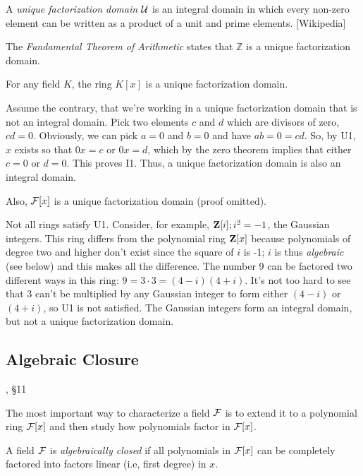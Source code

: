 \begin{key point}
A {\it unique factorization domain} ${\cal U}$
is an integral domain in which every non-zero element can be written as a product of a unit and prime elements.
[Wikipedia]
\end{key point}


The {\it Fundamental Theorem of Arithmetic} states that ${\mathbb Z}$
is a unique factorization domain.

\theorem

For any field $K$, the ring $K[x]$ is a unique factorization domain.

\proof

Assume the contrary, that we're working in a unique factorization
domain that is not an integral domain.  Pick two elements $c$ and $d$
which are divisors of zero, $cd=0$.  Obviously, we can pick $a=0$ and
$b=0$ and have $ab=0=cd$.  So, by U1, $x$ exists so that $0x=c$ or
$0x=d$, which by the zero theorem implies that either $c=0$ or $d=0$.
This proves I1.  Thus, a unique factorization domain is also an
integral domain.

\endtheorem

Also, ${\cal F}[x]$ is a unique
factorization domain (proof omitted).

Not all rings satisfy U1.  Consider, for example, ${\bf Z}[i];
i^2=-1$, the Gaussian integers.  This ring differs from the polynomial
ring ${\bf Z}[x]$ because polynomials of degree two and higher don't
exist since the square of $i$ is -1; $i$ is thus {\it algebraic} (see
below) and this makes all the difference.  The number 9 can be
factored two different ways in this ring: $9=3\cdot3=(4-i)(4+i)$.
It's not too hard to see that 3 can't be multiplied by any Gaussian
integer to form either $(4-i)$ or $(4+i)$, so U1 is not satisfied.
The Gaussian integers form an integral domain, but not a unique
factorization domain.

\subsection*{\qquad Algebraic Closure}
, \S11

The most important way to characterize a field ${\cal F}$ is to extend
it to a polynomial ring ${\cal F}[x]$ and then study how polynomials
factor in ${\cal F}[x]$.

\begin{key point}
A field ${\cal F}$ is {\it algebraically closed} if all
polynomials in ${\cal F}[x]$ can be completely factored
into factors linear (i.e, first degree) in $x$.
\end{key point}

